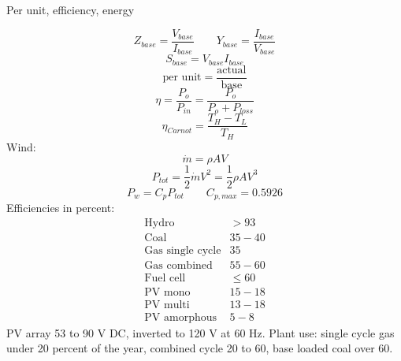 Per unit, efficiency, energy

$$Z_{base}=\frac{V_{base}}{I_{base}}\qquad Y_{base}=\frac{I_{base}}{V_{base}}$$
$$S_{base}=V_{base}I_{base}$$
$$\text{per unit}=\frac{\text{actual}}{\text{base}}$$
$$\eta=\frac{P_o}{P_{in}}=\frac{P_o}{P_o+P_{loss}}$$
$$\eta_{Carnot}=\frac{T_H-T_L}{T_H}$$
Wind:
$$\dot m=\rho AV$$
$$P_{tot}=\frac{1}{2}\dot mV^2=\frac{1}{2}\rho AV^3$$
$$P_w=C_pP_{tot}\qquad C_{p,max}=0.5926$$
Efficiencies in percent:
$$\begin{array}{lc}\text{Hydro}&>93\\\text{Coal}&35-40\\\text{Gas single cycle}&35\\\text{Gas combined}&55-60\\\text{Fuel cell}&\le60\\\text{PV mono}&15-18\\\text{PV multi}&13-18\\\text{PV amorphous}&5-8\end{array}$$
PV array 53 to 90 V DC, inverted to 120 V at 60 Hz. Plant use: single cycle gas under 20 percent of the year, combined cycle 20 to 60, base loaded coal over 60.
